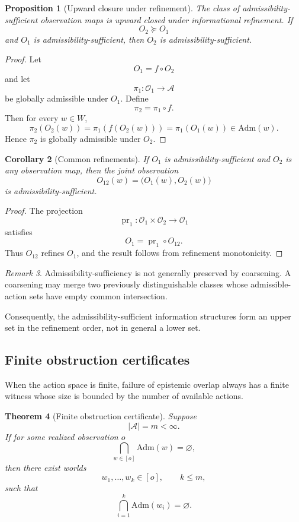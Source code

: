 \documentclass[11pt]{article}
\newtheorem{theorem}{Theorem}[section]
\newtheorem{corollary}[theorem]{Corollary}
\newtheorem{proposition}[theorem]{Proposition}
\theoremstyle{definition}
\theoremstyle{remark}
\newtheorem{remark}[theorem]{Remark}
\newcommand{\worlds}{W}
\newcommand{\acts}{\mathcal{A}}
\newcommand{\obs}{\mathcal{O}}
\newcommand{\admissible}{\mathrm{Adm}}
\begin{document}
\begin{proposition}[Upward closure under refinement]
The class of admissibility-sufficient observation maps is upward closed under
informational refinement. If
\[
  O_2\succeq O_1
\]
and $O_1$ is admissibility-sufficient, then $O_2$ is
admissibility-sufficient.
\end{proposition}

\begin{proof}
Let
\[
  O_1=f\circ O_2
\]
and let
\[
  \pi_1:\obs_1\to\acts
\]
be globally admissible under $O_1$. Define
\[
  \pi_2=\pi_1\circ f.
\]
Then for every $w\in\worlds$,
\[
  \pi_2(O_2(w))
  =
  \pi_1(f(O_2(w)))
  =
  \pi_1(O_1(w))
  \in
  \admissible(w).
\]
Hence $\pi_2$ is globally admissible under $O_2$.
\end{proof}

\begin{corollary}[Common refinements]
If $O_1$ is admissibility-sufficient and $O_2$ is any observation map, then
the joint observation
\[
  O_{12}(w)
  =
  \bigl(O_1(w),O_2(w)\bigr)
\]
is admissibility-sufficient.
\end{corollary}

\begin{proof}
The projection
\[
  \operatorname{pr}_1:
  \obs_1\times\obs_2\to\obs_1
\]
satisfies
\[
  O_1
  =
  \operatorname{pr}_1\circ O_{12}.
\]
Thus $O_{12}$ refines $O_1$, and the result follows from refinement
monotonicity.
\end{proof}

\begin{remark}
Admissibility-sufficiency is not generally preserved by coarsening. A
coarsening may merge two previously distinguishable classes whose
admissible-action sets have empty common intersection.

Consequently, the admissibility-sufficient information structures form an
upper set in the refinement order, not in general a lower set.
\end{remark}

\subsection{Finite obstruction certificates}

When the action space is finite, failure of epistemic overlap always has a
finite witness whose size is bounded by the number of available actions.

\begin{theorem}[Finite obstruction certificate]
Suppose
\[
  |\acts|=m<\infty.
\]
If for some realized observation $o$
\[
  \bigcap_{w\in[o]}\admissible(w)
  =
  \varnothing,
\]
then there exist worlds
\[
  w_1,\ldots,w_k\in[o],
  \qquad
  k\leq m,
\]
such that
\[
  \bigcap_{i=1}^{k}\admissible(w_i)
  =
  \varnothing.
\]
\end{theorem}
\end{document}
